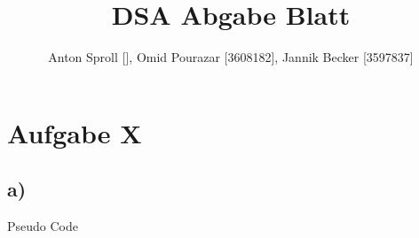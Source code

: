 \documentclass{scrartcl}
\title{DSA Abgabe Blatt \workSheet}
\author{Anton Sproll [], Omid Pourazar [3608182], Jannik Becker [3597837]}
\date{\dateOfFinishing }
\begin{document}
	\maketitle
	\newpage

	\section*{Aufgabe X}
	\subsection*{a)}

	
	
	
	\begin{algorithm}
		\caption{Pseudo Code}
		\begin{algorithmic} [1]
		\end{algorithmic}
	\end{algorithm}
\end{document}
